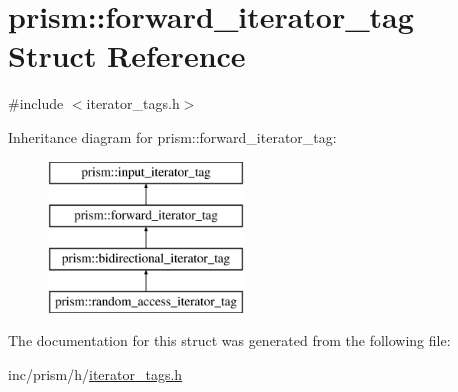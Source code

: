 \hypertarget{structprism_1_1forward__iterator__tag}{}\section{prism\+:\+:forward\+\_\+iterator\+\_\+tag Struct Reference}
\label{structprism_1_1forward__iterator__tag}


{\ttfamily \#include $<$iterator\+\_\+tags.\+h$>$}

Inheritance diagram for prism\+:\+:forward\+\_\+iterator\+\_\+tag\+:\begin{figure}[H]
\begin{center}
\leavevmode
\includegraphics[height=4.000000cm]{structprism_1_1forward__iterator__tag}
\end{center}
\end{figure}


The documentation for this struct was generated from the following file\+:\begin{DoxyCompactItemize}
\item 
inc/prism/h/\hyperlink{iterator__tags_8h}{iterator\+\_\+tags.\+h}\end{DoxyCompactItemize}

